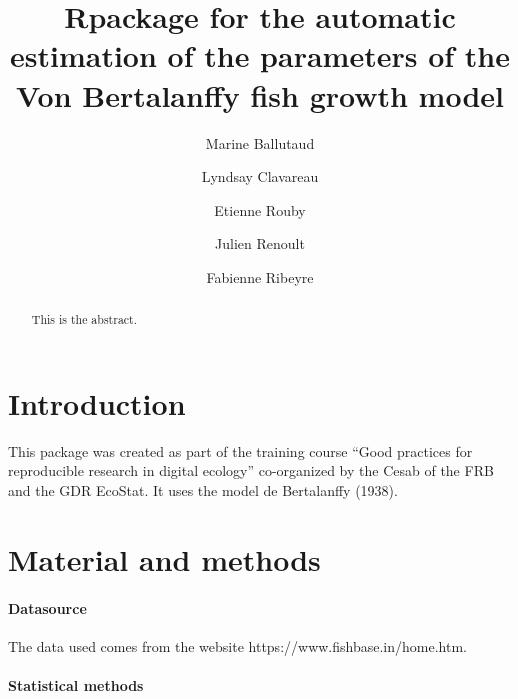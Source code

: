 \documentclass[]{elsarticle} %
\begin{document}
\begin{frontmatter}

  \title{Rpackage for the automatic estimation of the parameters of the
Von Bertalanffy fish growth model}
    \author[Université de Lille]{Marine Ballutaud}
    \author[IFREMER]{Lyndsay Clavareau}
    \author[Observatoire Pelagis]{Etienne Rouby}
    \author[Centre d'Ecologie Fonctionnelle et Evolutive]{Julien
Renoult}
    \author[Cirad]{Fabienne Ribeyre}
      \address[Université de Lille]{Department, Street, City, State,
Zip}
  
  \begin{abstract}
  This is the abstract.
  \end{abstract}
  
 \end{frontmatter}

\hypertarget{introduction}{%
\section{Introduction}\label{introduction}}

This package was created as part of the training course ``Good practices
for reproducible research in digital ecology'' co-organized by the Cesab
of the FRB and the GDR EcoStat. It uses the model de Bertalanffy (1938).

\hypertarget{material-and-methods}{%
\section{Material and methods}\label{material-and-methods}}

\hypertarget{datasource}{%
\paragraph{Datasource}\label{datasource}}

The data used comes from the website https://www.fishbase.in/home.htm.

\hypertarget{statistical-methods}{%
\paragraph{Statistical methods}\label{statistical-methods}}
\end{document}
